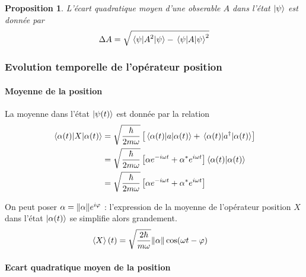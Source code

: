 \documentclass[11pt,oneside,a4paper]{article}
\newcommand{\h}{\ensuremath{\hbar}}
\newtheorem{property}[theorem]{Proposition}
\begin{document}
\begin{property}
  L'écart quadratique moyen d'une obserable $A$ dans l'état $\ket{\psi}$ est donnée par
  \begin{align}
    \label{ecart quadratique moyen}
    \Delta A = \sqrt{\expval{A^2}{\psi} - \expval{A}{\psi}^2}
  \end{align}
\end{property}

\subsubsection{Evolution temporelle de l'opérateur position}
\label{Evolution temporelle de l'opérateur position}

\paragraph{Moyenne de la position}

La moyenne dans l'état $\ket{\psi(t)}$ est donnée par la relation
\begin{align}
  \expval{X}{{\alpha(t)}} &= \sqrt{\frac{\h}{2m\omega}}\left[\expval{a}{\alpha(t)}+\expval{a^\dagger}{\alpha(t)}\right]\\
  &= \sqrt{\frac{\h}{2m\omega}} \left[\alpha e^{-i\omega t}+\alpha^*e^{i\omega t}\right]\braket{\alpha(t)}\\
  &= \sqrt{\frac{\h}{2m\omega}} \left[\alpha e^{-i\omega t}+\alpha^*e^{i\omega t}\right]
\end{align}

On peut poser $\alpha = \norm{\alpha}e^{i\varphi}$ : l'expression de la moyenne de l'opérateur position $X$ dans l'état $\ket{\alpha(t)}$ se simplifie alors grandement.
\begin{align}
  \label{mean position}
  \expval{X}(t)&= \sqrt{\frac{2\h}{m\omega}}\norm{\alpha}\cos(\omega t-\varphi)
\end{align}

\paragraph{Ecart quadratique moyen de la position}
\end{document}

